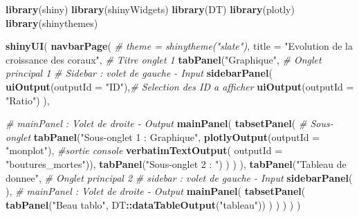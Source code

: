 \documentclass[]{report}
\newenvironment{Shaded}{\begin{snugshade}}{\end{snugshade}}
\newcommand{\KeywordTok}[1]{\textcolor[rgb]{0.13,0.29,0.53}{\textbf{#1}}}
\newcommand{\DataTypeTok}[1]{\textcolor[rgb]{0.13,0.29,0.53}{#1}}
\newcommand{\StringTok}[1]{\textcolor[rgb]{0.31,0.60,0.02}{#1}}
\newcommand{\CommentTok}[1]{\textcolor[rgb]{0.56,0.35,0.01}{\textit{#1}}}
\newcommand{\OperatorTok}[1]{\textcolor[rgb]{0.81,0.36,0.00}{\textbf{#1}}}
\newcommand{\NormalTok}[1]{#1}
\begin{document}
\begin{Shaded}
\begin{Highlighting}[]
\KeywordTok{library}\NormalTok{(shiny)}
\KeywordTok{library}\NormalTok{(shinyWidgets)}
\KeywordTok{library}\NormalTok{(DT)}
\KeywordTok{library}\NormalTok{(plotly)}
\KeywordTok{library}\NormalTok{(shinythemes)}

\KeywordTok{shinyUI}\NormalTok{(}
  \KeywordTok{navbarPage}\NormalTok{(}
    \CommentTok{# theme = shinytheme("slate"),}
    \DataTypeTok{title =} \StringTok{"Evolution de la croissance des coraux"}\NormalTok{, }\CommentTok{# Titre onglet 1}
    \KeywordTok{tabPanel}\NormalTok{(}\StringTok{"Graphique"}\NormalTok{, }\CommentTok{# Onglet principal 1}
             \CommentTok{# Sidebar : volet de gauche - Input}
             \KeywordTok{sidebarPanel}\NormalTok{(}
               \KeywordTok{uiOutput}\NormalTok{(}\DataTypeTok{outputId =} \StringTok{"ID"}\NormalTok{),}\CommentTok{# Selection des ID a afficher}
               \KeywordTok{uiOutput}\NormalTok{(}\DataTypeTok{outputId =} \StringTok{"Ratio"}\NormalTok{)}
\NormalTok{             ),}

             \CommentTok{# mainPanel : Volet de droite - Output}
             \KeywordTok{mainPanel}\NormalTok{(}
               \KeywordTok{tabsetPanel}\NormalTok{( }\CommentTok{# Sous-onglet}
                 \KeywordTok{tabPanel}\NormalTok{(}\StringTok{"Sous-onglet 1 : Graphique"}\NormalTok{,}
                          \KeywordTok{plotlyOutput}\NormalTok{(}\DataTypeTok{outputId =} \StringTok{"monplot"}\NormalTok{),}
                          \CommentTok{#sortie console}
                          \KeywordTok{verbatimTextOutput}\NormalTok{(}
                            \DataTypeTok{outputId =} \StringTok{"boutures_mortes"}\NormalTok{)),}
                 \KeywordTok{tabPanel}\NormalTok{(}\StringTok{"Sous-onglet 2 : "}\NormalTok{)}
\NormalTok{               )}
\NormalTok{             )}
\NormalTok{    ),}
    \KeywordTok{tabPanel}\NormalTok{(}\StringTok{"Tableau de donnee"}\NormalTok{, }\CommentTok{# Onglet principal 2}
             \CommentTok{# sidebar : volet de gauche - Input}
             \KeywordTok{sidebarPanel}\NormalTok{(}
\NormalTok{             ),}
             \CommentTok{# mainPanel : Volet de droite - Output}
             \KeywordTok{mainPanel}\NormalTok{(}
               \KeywordTok{tabsetPanel}\NormalTok{(}
                 \KeywordTok{tabPanel}\NormalTok{(}\StringTok{"Beau tablo"}\NormalTok{, DT}\OperatorTok{::}\KeywordTok{dataTableOutput}\NormalTok{(}\StringTok{"tableau"}\NormalTok{))}
\NormalTok{               )}
\NormalTok{             )}
\NormalTok{    )}
\NormalTok{  )}
\NormalTok{)}
\end{Highlighting}
\end{Shaded}
\end{document}
